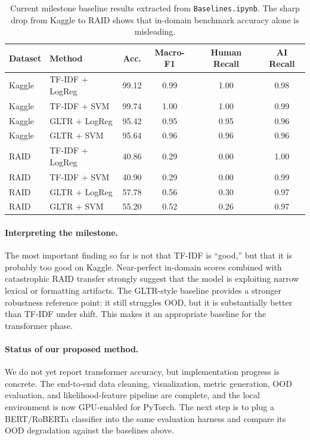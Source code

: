 \documentclass{article}
\begin{document}
\begin{table}[t]
\centering
\small
\begin{tabular}{llcccc}
\toprule
Dataset & Method & Acc. & Macro-F1 & Human Recall & AI Recall \\
\midrule
Kaggle & TF-IDF + LogReg & 99.12 & 0.99 & 1.00 & 0.98 \\
Kaggle & TF-IDF + SVM & 99.74 & 1.00 & 1.00 & 0.99 \\
Kaggle & GLTR + LogReg & 95.42 & 0.95 & 0.95 & 0.96 \\
Kaggle & GLTR + SVM & 95.64 & 0.96 & 0.96 & 0.96 \\
\midrule
RAID & TF-IDF + LogReg & 40.86 & 0.29 & 0.00 & 1.00 \\
RAID & TF-IDF + SVM & 40.90 & 0.29 & 0.00 & 0.99 \\
RAID & GLTR + LogReg & 57.78 & 0.56 & 0.30 & 0.97 \\
RAID & GLTR + SVM & 55.20 & 0.52 & 0.26 & 0.97 \\
\bottomrule
\end{tabular}
\caption{Current milestone baseline results extracted from \texttt{Baselines.ipynb}. The sharp drop from Kaggle to RAID shows that in-domain benchmark accuracy alone is misleading.}
\label{tab:main-results}
\end{table}

\paragraph{Interpreting the milestone.}
The most important finding so far is not that TF-IDF is ``good,'' but that it is probably too good on Kaggle. Near-perfect in-domain scores combined with catastrophic RAID transfer strongly suggest that the model is exploiting narrow lexical or formatting artifacts. The GLTR-style baseline provides a stronger robustness reference point: it still struggles OOD, but it is substantially better than TF-IDF under shift. This makes it an appropriate baseline for the transformer phase.

\paragraph{Status of our proposed method.}
We do not yet report transformer accuracy, but implementation progress is concrete. The end-to-end data cleaning, visualization, metric generation, OOD evaluation, and likelihood-feature pipeline are complete, and the local environment is now GPU-enabled for PyTorch. The next step is to plug a BERT/RoBERTa classifier into the same evaluation harness and compare its OOD degradation against the baselines above.
\end{document}
